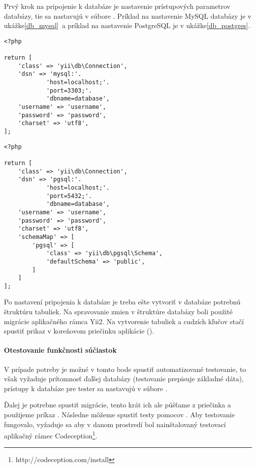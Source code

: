 Prvý krok na pripojenie k databáze je nastavenie prístupových parametrov databázy,
tie sa nastavujú v súbore . Príklad na nastavenie MySQL databázy
je v ukážke\ref{db_mysql} a príklad na nastavenie PostgreSQL je v ukážke\ref{db_postgres}.

\begin{lstlisting}[label=db_mysql,caption=Príklad nastavenia databázy MySQL]
<?php

return [
    'class' => 'yii\db\Connection',
    'dsn' => 'mysql:'.
            'host=localhost;'.
            'port=3303;'.
            'dbname=database',
    'username' => 'username',
    'password' => 'password',
    'charset' => 'utf8',
];
\end{lstlisting}

\begin{lstlisting}[label=db_postgres,caption=Príklad nastavenia databázy PostgreSQL]
<?php

return [
    'class' => 'yii\db\Connection',
    'dsn' => 'pgsql:'.
            'host=localhost;'.
            'port=5432;'.
            'dbname=database',
    'username' => 'username',
    'password' => 'password',
    'charset' => 'utf8',
    'schemaMap' => [
        'pgsql' => [
            'class' => 'yii\db\pgsql\Schema',
            'defaultSchema' => 'public',
        ]
    ]
];
\end{lstlisting}

Po nastavení pripojenia k databáze je treba ešte vytvoriť v databáze potrebnú štruktúru tabuliek.
Na spravovanie zmien v štruktúre databázy boli použité migrácie aplikačného rámca Yii2. 
Na vytvorenie tabuliek a cudzích kľučov stačí spustiť prikaz 
v koreňovom priečinku aplikácie ().

\paragraph{Otestovanie funkčnosti súčiastok}

V prípade potreby je možné v tomto bode spustiť automatizované testovanie, to však vyžaduje 
prítomnosť ďaľšej databázy (testovanie prepisuje základné dáta), prístupy k databáze pre 
tester sa nastavujú v súbore .

Ďalej je potrebne spustiť migrácie, tento krát ich ale púšťame z priečinka 
a použijeme príkaz . Následne môžeme spustiť 
testy pomocov . Aby testovanie fungovalo, vyžaduje sa aby v danom
prostredí bol nainštalovaný testovací aplikačný rámec
Codeception\footnote{http://codeception.com/install}.

